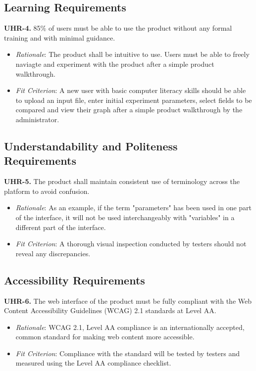 \documentclass[12pt]{article}
\begin{document}
\subsection{Learning Requirements}
\textbf{UHR-4.} 85\% of users must be able to use the product without any formal training and with minimal guidance.
\begin{itemize}
  \item \emph{Rationale}: The product shall be intuitive to use. Users must be able to freely naviagte and experiment with the product after a simple product walkthrough.
  \item \emph{Fit Criterion}: A new user with basic computer literacy skills should be able to upload an input file, enter initial experiment parameters, select fields to be compared and view their graph
  after a simple product walkthrough by the administrator.
\end{itemize}

\subsection{Understandability and Politeness Requirements}
\textbf{UHR-5.} The product shall maintain consistent use of terminology across the platform to avoid confusion.
\begin{itemize}
  \item \emph{Rationale}: As an example, if the term "parameters" has been used in one part of the interface, it will not be used interchangeably with "variables" in a different part of the interface.
  \item \emph{Fit Criterion}: A thorough visual inspection conducted by testers should not reveal any discrepancies.
\end{itemize}

\subsection{Accessibility Requirements}
\textbf{UHR-6.} The web interface of the product must be fully compliant with the Web Content Accessibility Guidelines (WCAG) 2.1 standards at Level AA.
\begin{itemize}
  \item \emph{Rationale}: WCAG 2.1, Level AA compliance is an internationally accepted, common standard for making web content more accessible.
  \item \emph{Fit Criterion}: Compliance with the standard will be tested by testers and measured using the Level AA compliance checklist.
\end{itemize}
\end{document}
